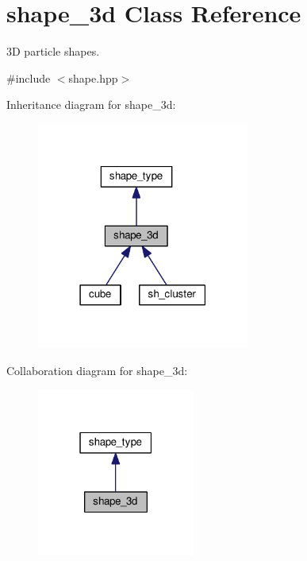 \hypertarget{classshape__3d}{}\section{shape\+\_\+3d Class Reference}
\label{classshape__3d}


3D particle shapes.  




{\ttfamily \#include $<$shape.\+hpp$>$}



Inheritance diagram for shape\+\_\+3d\+:
\nopagebreak
\begin{figure}[H]
\begin{center}
\leavevmode
\includegraphics[width=198pt]{da/d03/classshape__3d__inherit__graph}
\end{center}
\end{figure}


Collaboration diagram for shape\+\_\+3d\+:
\nopagebreak
\begin{figure}[H]
\begin{center}
\leavevmode
\includegraphics[width=147pt]{d3/da0/classshape__3d__coll__graph}
\end{center}
\end{figure}
